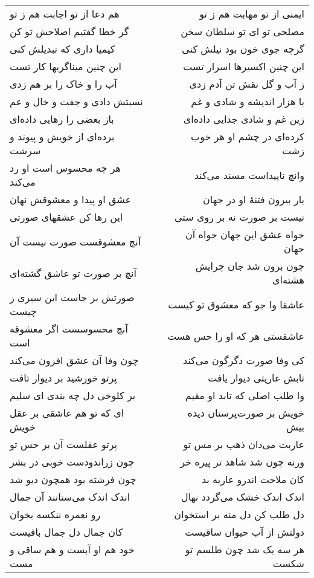 \begin{center}
\begin{longtable}{l p{0.5cm} r}
\\
هم دعا از تو اجابت هم ز تو
&&
ایمنی از تو مهابت هم ز تو
\\
گر خطا گفتیم اصلاحش تو کن
&&
مصلحی تو ای تو سلطان سخن
\\
کیمیا داری که تبدیلش کنی
&&
گرچه جوی خون بود نیلش کنی
\\
این چنین میناگریها کار تست
&&
این چنین اکسیرها اسرار تست
\\
آب را و خاک را بر هم زدی
&&
ز آب و گل نقش تن آدم زدی
\\
نسبتش دادی و جفت و خال و عم
&&
با هزار اندیشه و شادی و غم
\\
باز بعضی را رهایی داده‌ای
&&
زین غم و شادی جدایی داده‌ای
\\
برده‌ای از خویش و پیوند و سرشت
&&
کرده‌ای در چشم او هر خوب زشت
\\
هر چه محسوس است او رد می‌کند
&&
وانچ ناپیداست مسند می‌کند
\\
عشق او پیدا و معشوقش نهان
&&
یار بیرون فتنهٔ او در جهان
\\
این رها کن عشقهای صورتی
&&
نیست بر صورت نه بر روی ستی
\\
آنچ معشوقست صورت نیست آن
&&
خواه عشق این جهان خواه آن جهان
\\
آنچ بر صورت تو عاشق گشته‌ای
&&
چون برون شد جان چرایش هشته‌ای
\\
صورتش بر جاست این سیری ز چیست
&&
عاشقا وا جو که معشوق تو کیست
\\
آنچ محسوسست اگر معشوقه است
&&
عاشقستی هر که او را حس هست
\\
چون وفا آن عشق افزون می‌کند
&&
کی وفا صورت دگرگون می‌کند
\\
پرتو خورشید بر دیوار تافت
&&
تابش عاریتی دیوار یافت
\\
بر کلوخی دل چه بندی ای سلیم
&&
وا طلب اصلی که تابد او مقیم
\\
ای که تو هم عاشقی بر عقل خویش
&&
خویش بر صورت‌پرستان دیده بیش
\\
پرتو عقلست آن بر حس تو
&&
عاریت می‌دان ذهب بر مس تو
\\
چون زراندودست خوبی در بشر
&&
ورنه چون شد شاهد تر پیره خر
\\
چون فرشته بود همچون دیو شد
&&
کان ملاحت اندرو عاریه بد
\\
اندک اندک می‌ستانند آن جمال
&&
اندک اندک خشک می‌گردد نهال
\\
رو نعمره ننکسه بخوان
&&
دل طلب کن دل منه بر استخوان
\\
کان جمال دل جمال باقیست
&&
دولتش از آب حیوان ساقیست
\\
خود هم او آبست و هم ساقی و مست
&&
هر سه یک شد چون طلسم تو شکست
\\

\end{longtable}
\end{center}
